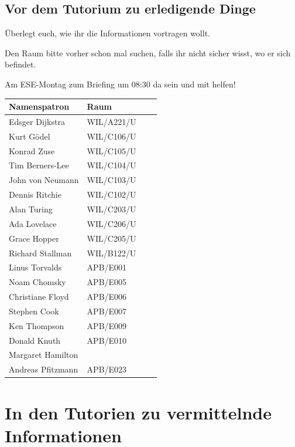 \documentclass[a4paper,12pt]{report}
\begin{document}
\section{Vor dem Tutorium zu erledigende Dinge}
\begin{itemize*}
\item Überlegt euch, wie ihr die Informationen vortragen wollt.
\item Den Raum bitte vorher schon mal suchen, falls ihr nicht sicher wisst, wo er sich befindet.
\item Am ESE-Montag zum Briefing um 08:30 da sein und mit helfen!
\end{itemize*}

\label{tabelle}
\begin{center}
\vspace{1cm}
\begin{tabular}[h]{|l|l|l|l|}
	\hline
	\textbf{Namenspatron}		& \textbf{Raum}\\ \hline
	Edsger Dijkstra				& WIL/A221/U\\
	Kurt Gödel					& WIL/C106/U\\
	Konrad Zuse					& WIL/C105/U\\
	Tim Berners-Lee				& WIL/C104/U\\
	John von Neumann			& WIL/C103/U\\
	Dennis Ritchie				& WIL/C102/U\\
	Alan Turing 				& WIL/C203/U\\
	Ada Lovelace				& WIL/C206/U\\
	Grace Hopper				& WIL/C205/U\\
	Richard Stallman			& WIL/B122/U\\
	Linus Torvalds				& APB/E001\\
	Noam Chomsky				& APB/E005\\
	Christiane Floyd			& APB/E006\\
	Stephen Cook				& APB/E007\\
	Ken Thompson				& APB/E009\\
	Donald Knuth				& APB/E010\\
	Margaret Hamilton			& \\
	Andreas Pfitzmann			& APB/E023\\
	\hline
\end{tabular}
\end{center}

\chapter{In den Tutorien zu vermittelnde Informationen}
\end{document}
